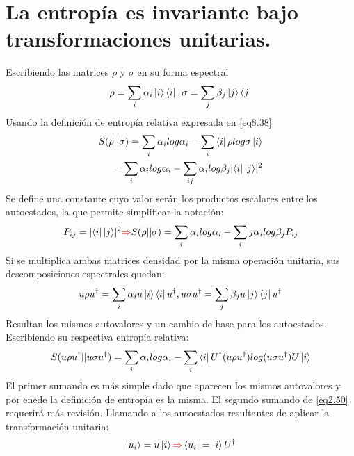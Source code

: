 \documentclass{book}
\begin{document}
    \section{{La entropía es invariante bajo transformaciones unitarias.}}Escribiendo las matrices $\rho$ y $\sigma$ en su forma espectral
    \begin{equation}\label{eq8.46}{\rho=\sum_i \alpha_i\ket{i}\bra{i}, \sigma=\sum_j \beta_j\ket{j}\bra{j}}\end{equation}
    Usando la definición de entropía relativa expresada en \ref{eq8.38}
    \begin{equation} \begin{aligned}\label{eq8.47}{S(\rho||\sigma)=\sum_i \alpha_i log \alpha_i - \sum_i\bra{i}\rho log \sigma \ket{i}} \\ { =\sum_{i}\alpha_i log \alpha_i-\sum_{ij}\alpha_i log \beta_j \lvert\bra{i}\ket{j}\rvert^2} \end{aligned} \end{equation}
    Se define una constante cuyo valor serán los productos escalares entre los autoestados, la que permite simplificar la notación:
    \begin{equation}\label{eq8.48}{P_{ij}=\lvert\bra{i}\ket{j}\rvert^2 \textcolor{red}{\Rightarrow} S(\rho||\sigma)=\sum_i \alpha_i log \alpha_i -\sum_ij \alpha_i log \beta_j P_{ij}}\end{equation}
    Si se multiplica ambas matrices densidad por la misma operación unitaria, sus descomposiciones espectrales quedan:
    \begin{equation}\label{eq8.49}{u\rho u^\dag=\sum_i \alpha_i u\ket{i}\bra{i}u^\dag, u\sigma u^\dag=\sum_j \beta_j u\ket{j}\bra{j}u^\dag}\end{equation}
    Resultan los mismos autovalores y un cambio de base para los autoestados. Escribiendo su respectiva entropía relativa:
    \begin{equation}\label{eq8.50}{ S(u\rho u^\dag||u\sigma u^\dag)=\sum_i \alpha_i log \alpha_i - \sum_i\bra{i} U^\dag (u\rho u^\dag) log (u\sigma u^\dag) U\ket{i}}\end{equation}
    El primer sumando es más simple dado que aparecen los mismos autovalores y por enede la definición de entropía es la misma. El segundo sumando de \ref{eq2.50} requerirá más revisión. Llamando a los autoestados resultantes de aplicar la transformación unitaria:
    \begin{equation}\label{eq8.50a}{ \ket{u_i}= u\ket{i} \textcolor{red}{\Rightarrow} \bra{u_i}=\ket{i}U^\dag}\end{equation}
\end{document}
